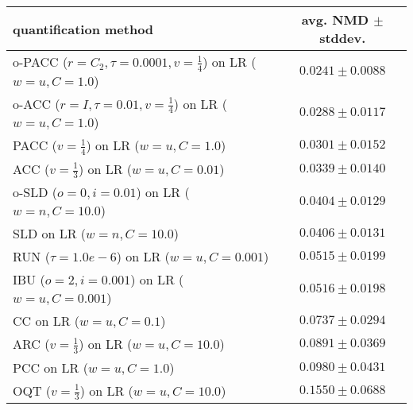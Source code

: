 \begin{tabular}{lc}
  \toprule
  quantification method & avg. NMD $\pm$ stddev. \\
  \midrule
  o-PACC ($r=C_2, \tau=0.0001, v=\frac{1}{4}$) on LR ($w=u, C=1.0$) & $\mathbf{0.0241 \pm 0.0088}$ \\
  o-ACC ($r=I, \tau=0.01, v=\frac{1}{4}$) on LR ($w=u, C=1.0$) & $0.0288 \pm 0.0117$ \\
  PACC ($v=\frac{1}{4}$) on LR ($w=u, C=1.0$) & $0.0301 \pm 0.0152$ \\
  ACC ($v=\frac{1}{3}$) on LR ($w=u, C=0.01$) & $0.0339 \pm 0.0140$ \\
  o-SLD ($o=0, i=0.01$) on LR ($w=n, C=10.0$) & $0.0404 \pm 0.0129$ \\
  SLD on LR ($w=n, C=10.0$) & $0.0406 \pm 0.0131$ \\
  RUN ($\tau=1.0e-6$) on LR ($w=u, C=0.001$) & $0.0515 \pm 0.0199$ \\
  IBU ($o=2, i=0.001$) on LR ($w=u, C=0.001$) & $0.0516 \pm 0.0198$ \\
  CC on LR ($w=u, C=0.1$) & $0.0737 \pm 0.0294$ \\
  ARC ($v=\frac{1}{3}$) on LR ($w=u, C=10.0$) & $0.0891 \pm 0.0369$ \\
  PCC on LR ($w=u, C=1.0$) & $0.0980 \pm 0.0431$ \\
  OQT ($v=\frac{1}{3}$) on LR ($w=u, C=10.0$) & $0.1550 \pm 0.0688$ \\
  \bottomrule
\end{tabular}
